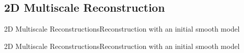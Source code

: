 
\subsection{2D Multiscale Reconstruction}
\begin{frame}{2D Multiscale Reconstructions}{Reconstruction with an initial smooth model}
  \vspace{-0.5cm}
  \renewcommand{\modelfile}{fig/marmousi_filter_0}
  \renewcommand{\modeltitle}{Initial $\velocity$ Model}
  \begin{figure}
        \hfill
  \end{figure}
  \vspace{-1cm}
  \renewcommand{\modeltitle}{Target $\velocity$ Model}
  \renewcommand{\modelfile}{fig/marmousi_target}
  \begin{figure}
        \hfill
   \end{figure}
\end{frame}

\begin{frame}[noframenumbering]{2D Multiscale Reconstructions}{Reconstruction with an initial smooth model}
  \vspace{-0.5cm}
  \renewcommand{\modelfile}{fig/marmousi_nofilter}
  \renewcommand{\modeltitle}{Reconstructed model $\velocity$ Model (30 iterations AB3)}
  \begin{figure}
        \hfill
  \end{figure}
  \vspace{-1cm}
  \renewcommand{\modeltitle}{Target $\velocity$ Model}
  \renewcommand{\modelfile}{fig/marmousi_target}
  \begin{figure}
        \hfill
   \end{figure}
\end{frame}






